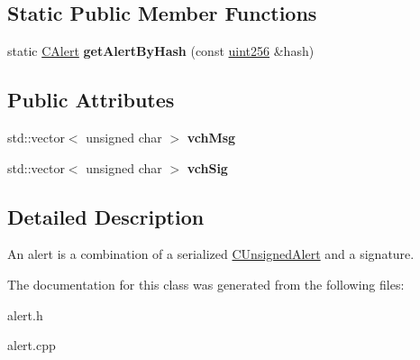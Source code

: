 \subsection*{Static Public Member Functions}
\begin{DoxyCompactItemize}
\item 
\mbox{\label{class_c_alert_aa37df9d177a6841ec5fa1e611c42b968}} 
static \mbox{\hyperlink{class_c_alert}{C\+Alert}} {\bfseries get\+Alert\+By\+Hash} (const \mbox{\hyperlink{classuint256}{uint256}} \&hash)
\end{DoxyCompactItemize}
\subsection*{Public Attributes}
\begin{DoxyCompactItemize}
\item 
\mbox{\label{class_c_alert_abfcb3b339d052cd3dd6670b03286758a}} 
std\+::vector$<$ unsigned char $>$ {\bfseries vch\+Msg}
\item 
\mbox{\label{class_c_alert_a541b49670ebf387a5f8b7de59277fed0}} 
std\+::vector$<$ unsigned char $>$ {\bfseries vch\+Sig}
\end{DoxyCompactItemize}


\subsection{Detailed Description}
An alert is a combination of a serialized \mbox{\hyperlink{class_c_unsigned_alert}{C\+Unsigned\+Alert}} and a signature. 

The documentation for this class was generated from the following files\+:\begin{DoxyCompactItemize}
\item 
alert.\+h\item 
alert.\+cpp\end{DoxyCompactItemize}
